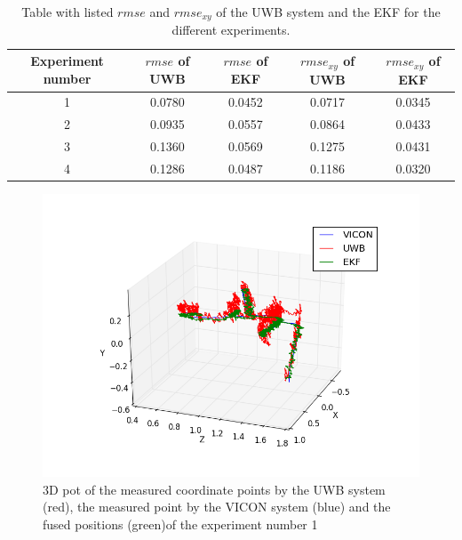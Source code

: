 \begin{table}[ht!]
\begin{center}
\begin{tabular}{c|c|c|c|c}
	Experiment number & $\textit{rmse}$ of \ac{UWB} & $\textit{rmse}$ of \ac{EKF} & $\textit{rmse}_{xy}$ of \ac{UWB} & $\textit{rmse}_{xy}$ of \ac{EKF}\\ 
	\hline 
	1 & 0.0780 & 0.0452 & 0.0717 & 0.0345 \\
	2 & 0.0935 & 0.0557 & 0.0864 & 0.0433 \\
	3 & 0.1360 & 0.0569 & 0.1275 & 0.0431 \\
	4 & 0.1286 & 0.0487 & 0.1186 & 0.0320
\end{tabular}
\end{center}
\caption{Table with listed $\textit{rmse}$ and $\textit{rmse}_{xy}$ of the \ac{UWB} system and the \ac{EKF} for the different experiments.}
\label{tab:results}
\end{table}

\begin{figure}[ht!]\centering
	\includegraphics[width=1.0\textwidth]{figures/evaluation}
	\caption{3D pot of the measured coordinate points by the \ac{UWB} system (red), the measured point by the VICON system (blue) and the fused positions (green)of the experiment number 1}\label{fig:evaluation}
\end{figure}

